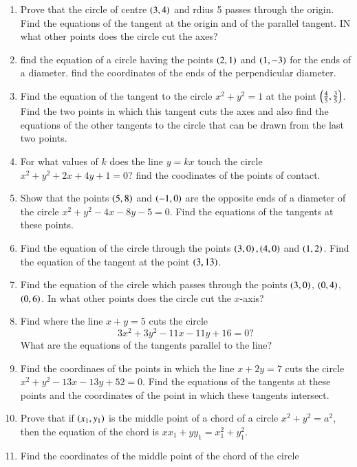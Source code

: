 \renewcommand{\theequation}{\theenumi}
\begin{enumerate}[label=\arabic*.,ref=\thesubsection.\theenumi]
\item Prove that the circle of centre $\left(3,4\right)$ and rdius 5 passes
through the origin.  Find the equations of the tangent at the origin 
and of the parallel tangent.  IN what other points does the circle
cut the axes?
\item find the equation of a circle having the points $\left(2,1\right)$
and $\left(1,-3\right)$ for the ends of a diameter.  find
the coordinates of the ends of the perpendicular diameter.
\item Find the equation of the tangent to the circle $x^2+y^2=1$
at the point $\left(\frac{4}{5},\frac{3}{5}\right)$.  Find the two points
in which this tangent cuts the axes and also find the equations of the other
tangents to the circle that can be drawn from the last two points.
\item For what values of $k$ does the line $y=kx$ touch the circle
$x^2+y^2+2x+4y+1=0$?  find the coodinates of the points of contact.
\item Show that the points $\left(5,8\right)$ and $\left(-1,0\right)$ are the opposite
ends of a diameter of the circle $x^2+y^2-4x-8y-5=0$.  Find the equations
of the tangents at these points.
\item Find the equation of the circle through the points $\left(3,0\right),\left(4,0\right)$
and $\left(1,2\right)$.  Find the equation of the tangent at the point $\left(3,13\right)$.
\item Find the equation of the circle which passes through the points
$\left(3,0\right)$, $\left(0,4\right)$, $\left(0,6\right)$.  In what other points does the circle
cut the $x$-axis?
\item Find where the line $x+y=5$ cuts the circle 
\begin{equation}
3x^2+3y^2-11x-11y+16=0?
\end{equation}
What are the equations of the tangents parallel to the line?
\item Find the coordinaes of the points in which the line $x+2y=7$ cuts the
circle $x^2+y^2-13x-13y+52=0$.  Find the equations of the tangents at these
points and the coordinates of the point in which these tangents intersect.
\item Prove that if $\left(x_1,y_1\right)$ is the middle point of a chord of a circle
$x^2+y^2=a^2$, then the equation of the chord is $xx_1+yy_1 = x_1^2+y_1^2$.  
\item Find the coordinates of the middle point of the chord of the circle

\end{enumerate}
